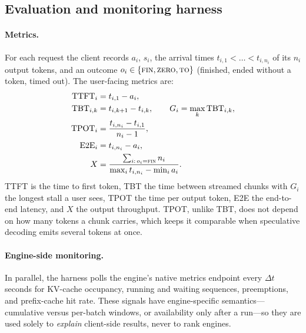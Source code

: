 \subsection{Evaluation and monitoring harness}
\label{sec:harness}

\paragraph{Metrics.}
For each request the client records $a_i$, $s_i$, the arrival times $t_{i,1} < \dots < t_{i,n_i}$
of its $n_i$ output tokens, and an outcome $o_i \in \{\textsc{fin}, \textsc{zero}, \textsc{to}\}$
(finished, ended without a token, timed out). The user-facing metrics are:
\begin{align}
  \mathrm{TTFT}_i &= t_{i,1} - a_i, \label{eq:ttft}\\
  \mathrm{TBT}_{i,k} &= t_{i,k+1} - t_{i,k}, \qquad G_i = \max_k \mathrm{TBT}_{i,k}, \label{eq:tbt}\\
  \mathrm{TPOT}_i &= \frac{t_{i,n_i} - t_{i,1}}{n_i - 1}, \label{eq:tpot}\\
  \mathrm{E2E}_i &= t_{i,n_i} - a_i, \label{eq:e2e}\\
  X &= \frac{\sum_{i:\,o_i=\textsc{fin}} n_i}{\max_i t_{i,n_i} - \min_i a_i}. \label{eq:thr}
\end{align}
TTFT is the time to first token, TBT the time between streamed chunks with $G_i$ the longest stall a
user sees, TPOT the time per output token, E2E the end-to-end latency, and $X$ the output throughput.
TPOT, unlike TBT, does not depend on how many tokens a chunk carries, which keeps it comparable when
speculative decoding emits several tokens at once.

\paragraph{Engine-side monitoring.}\label{sec:observability}
In parallel, the harness polls the engine's native metrics endpoint every $\Delta t$ seconds for
KV-cache occupancy, running and waiting sequences, preemptions, and prefix-cache hit rate. These
signals have engine-specific semantics---cumulative versus per-batch windows, or availability only
after a run---so they are used solely to \emph{explain} client-side results, never to rank engines.

